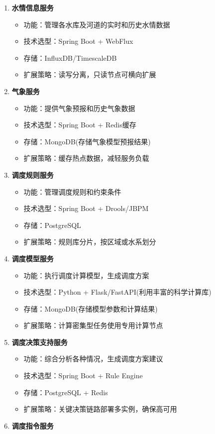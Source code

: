 \begin{enumerate}
\def\labelenumi{\arabic{enumi}.}
\tightlist
\item
  \textbf{水情信息服务}

  \begin{itemize}
  \tightlist
  \item
    功能：管理各水库及河道的实时和历史水情数据
  \item
    技术选型：Spring Boot + WebFlux
  \item
    存储：InfluxDB/TimescaleDB
  \item
    扩展策略：读写分离，只读节点可横向扩展
  \end{itemize}
\item
  \textbf{气象服务}

  \begin{itemize}
  \tightlist
  \item
    功能：提供气象预报和历史气象数据
  \item
    技术选型：Spring Boot + Redis缓存
  \item
    存储：MongoDB(存储气象模型预报结果)
  \item
    扩展策略：缓存热点数据，减轻服务负载
  \end{itemize}
\item
  \textbf{调度规则服务}

  \begin{itemize}
  \tightlist
  \item
    功能：管理调度规则和约束条件
  \item
    技术选型：Spring Boot + Drools/JBPM
  \item
    存储：PostgreSQL
  \item
    扩展策略：规则库分片，按区域或水系划分
  \end{itemize}
\item
  \textbf{调度模型服务}

  \begin{itemize}
  \tightlist
  \item
    功能：执行调度计算模型，生成调度方案
  \item
    技术选型：Python + Flask/FastAPI(利用丰富的科学计算库)
  \item
    存储：MongoDB(存储模型参数和计算结果)
  \item
    扩展策略：计算密集型任务使用专用计算节点
  \end{itemize}
\item
  \textbf{调度决策支持服务}

  \begin{itemize}
  \tightlist
  \item
    功能：综合分析各种情况，生成调度方案建议
  \item
    技术选型：Spring Boot + Rule Engine
  \item
    存储：PostgreSQL + Redis
  \item
    扩展策略：关键决策链路部署多实例，确保高可用
  \end{itemize}
\item
  \textbf{调度指令服务}


\end{enumerate}
